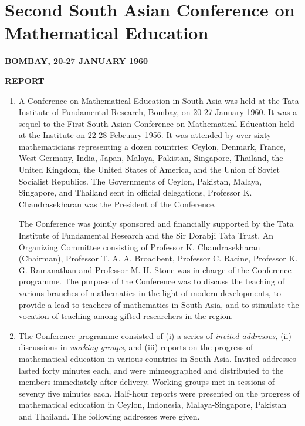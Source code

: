 
\chapter{Second South Asian Conference on Mathematical Education} 

\begin{center}
\textbf{BOMBAY, 20-27 JANUARY 1960}

\medskip

\textbf{REPORT}
\end{center}

\begin{enumerate}
\item  A Conference on Mathematical Education in South Asia was held
  at the Tata Institute of Fundamental Research, Bombay, on 20-27
  January 1960. It was a sequel to the First South Asian Conference on
  Mathematical Education held at the Institute on 22-28 February
  1956. It was attended by over sixty mathematicians representing a
  dozen countries: Ceylon, Denmark, France, West Germany, India,
  Japan, Malaya, Pakistan, Singapore, Thailand, the United Kingdom,
  the United States of America, and the Union of Soviet Socialist
  Republics. The Governments of Ceylon, Pakistan, Malaya, Singapore,
  and Thailand sent in official delegations, Professor
  K. Chandrasekharan was the President of the Conference.

The Conference was jointly sponsored and financially supported by the
Tata Institute of Fundamental Research and the Sir Dorabji Tata
Trust. An Organizing Committee consisting of Professor
K. Chandrasekharan (Chairman), Professor T. A. A. Broadbent, Professor
C. Racine, Professor K. G. Ramanathan and Professor M. H. Stone was in
charge of the Conference programme. The purpose of the Conference was
to discuss the teaching of various branches of mathematics in the
light of modern developments, to provide a lead to teachers of
mathematics in South Asia, and to stimulate the vocation of teaching
among gifted researchers in the region.

\item The Conference programme consisted of (i) a series of
  \textit{invited addresses,} (ii) discussions in \textit{working
    groups}, and (iii) reports on the progress of mathematical
  education in various countries in South Asia. Invited addresses
  lasted forty minutes each, and were mimeographed and distributed to
  the members immediately after delivery. Working groups met in
  sessions of seventy five minutes each. Half-hour reports were
  presented on the progress of mathematical education in Ceylon,
  Indonesia, Malaya-Singapore, Pakistan and Thailand. The following
  addresses were given.


\end{enumerate}
